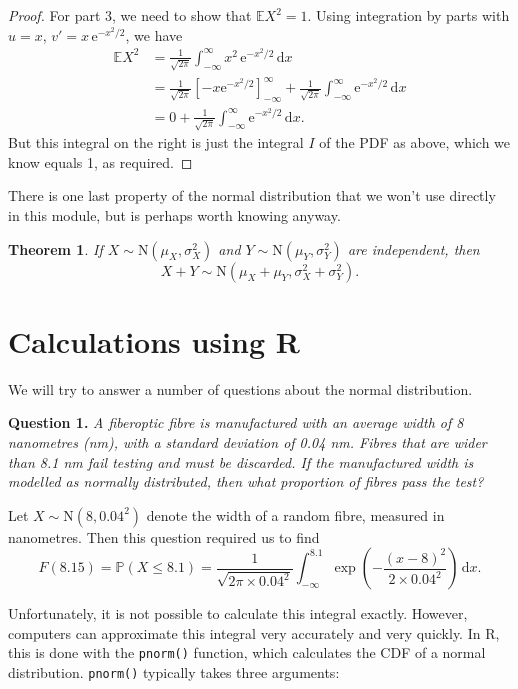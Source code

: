\documentclass[
  a4paper,
]{book}
\newtheorem{theorem}{Theorem}[chapter]
\theoremstyle{definition}
\theoremstyle{definition}
\theoremstyle{definition}
\theoremstyle{definition}
\theoremstyle{remark}
\begin{document}
\begin{proof}
For part 3, we need to show that \(\mathbb EX^2 = 1\). Using integration by parts with \(u = x\), \(v' = x\,\mathrm e^{-x^2/2}\), we have
\begin{align*}
\mathbb EX^2 &= \frac{1}{\sqrt{2\pi}} \int_{-\infty}^{\infty} x^2\,  \mathrm e^{-x^2/2}\, \mathrm dx \\
  &= \frac{1}{\sqrt{2\pi}} \left[-x \mathrm e^{-x^2/2}\right]_{-\infty}^\infty + \frac{1}{\sqrt{2\pi}} \int_{-\infty}^\infty \mathrm e^{-x^2/2} \, \mathrm dx \\
  &= 0 + \frac{1}{\sqrt{2\pi}} \int_{-\infty}^\infty \mathrm e^{-x^2/2} \, \mathrm dx .
\end{align*}
But this integral on the right is just the integral \(I\) of the PDF as above, which we know equals 1, as required.
\end{proof}

There is one last property of the normal distribution that we won't use directly in this module, but is perhaps worth knowing anyway.

\begin{theorem}
If \(X \sim \mathrm{N}(\mu_X, \sigma^2_X)\) and \(Y\sim \mathrm{N}(\mu_Y, \sigma^2_Y)\) are independent, then
\[ X+Y \sim \mathrm{N}(\mu_X + \mu_Y, \sigma^2_X+\sigma^2_Y) . \]
\end{theorem}

\hypertarget{normal-r}{%
\section{Calculations using R}\label{normal-r}}

We will try to answer a number of questions about the normal distribution.

\textbf{Question 1.} \emph{A fiberoptic fibre is manufactured with an average width of 8 nanometres (nm), with a standard deviation of 0.04 nm. Fibres that are wider than 8.1 nm fail testing and must be discarded. If the manufactured width is modelled as normally distributed, then what proportion of fibres pass the test?}

Let \(X \sim \mathrm{N}(8, 0.04^2)\) denote the width of a random fibre, measured in nanometres. Then this question required us to find
\[ F(8.15) = \mathbb P(X \leq 8.1) = \frac{1}{\sqrt{2\pi\times 0.04^2}} \int_{-\infty}^{8.1} \exp \left(-\frac{(x - 8)^2}{2\times 0.04^2} \right) \, \mathrm dx . \]

Unfortunately, it is not possible to calculate this integral exactly. However, computers can approximate this integral very accurately and very quickly. In R, this is done with the \texttt{pnorm()} function, which calculates the CDF of a normal distribution. \texttt{pnorm()} typically takes three arguments:
\end{document}
